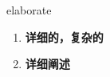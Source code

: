 
\begin{frame}
{\huge elaborate}
\begin{center}
\begin{enumerate}\Large
  \item \textbf{详细的，复杂的}
  \item \textbf{详细阐述}
\end{enumerate}
\end{center}
\end{frame}
